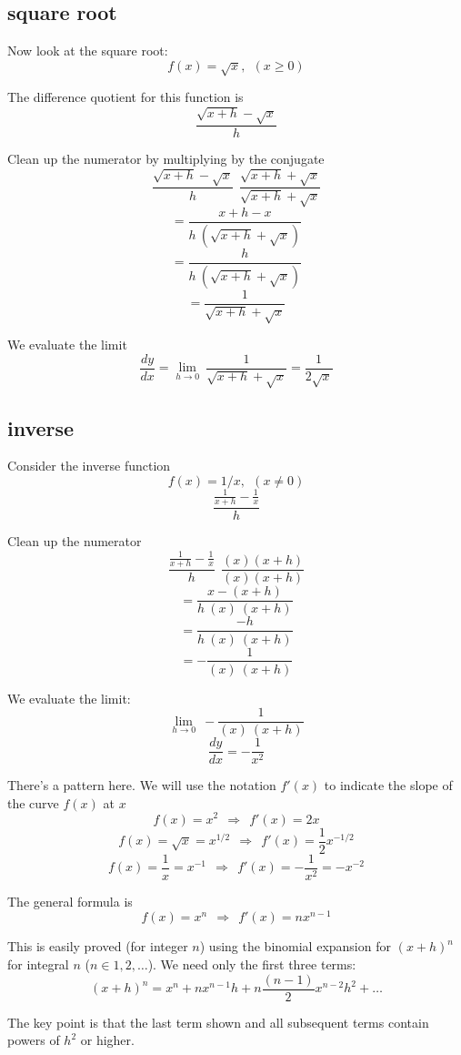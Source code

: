 \documentclass[11pt, oneside]{article}
\begin{document}
\subsection*{square root}

Now look at the square root:
\[  f(x)=\sqrt{x}, \ \ (x \ge 0) \]

The difference quotient for this function is
\[   \frac{\sqrt{x+h} - \sqrt{x}}{h} \]

Clean up the numerator by multiplying by the conjugate
\[    \frac{\sqrt{x+h} - \sqrt{x}}{h} \ \  \frac{\sqrt{x+h} + \sqrt{x}}{\sqrt{x+h} + \sqrt{x}} \]
\[    = \frac{x + h - x}{h \ (\sqrt{x+h} + \sqrt{x})} \]
\[    = \frac{h}{h \ (\sqrt{x+h} + \sqrt{x}) } \]
\[    = \frac{1}{\sqrt{x+h} + \sqrt{x}} \]

We evaluate the limit
\[    \frac{dy}{dx} = \lim_{h \to 0} \  \frac{1}{\sqrt{x+h} + \sqrt{x}} = \frac{1}{2\sqrt{x}} \]

\subsection*{inverse}

Consider the inverse function
\[   f(x)=1/x, \ \ (x \ne 0) \]
\[    \frac {  \frac{1}{x+h} - \frac{1}{x}  }  {h} \]

Clean up the numerator
\[    \frac {  \frac{1}{x+h} - \frac{1}{x}  }  {h} \ \  \frac{(x)(x+h)}{(x)(x+h)} \]
\[    = \frac {x - (x+h)}  {h\ (x) \ (x+h)} \]
\[    = \frac {-h}  {h\ (x) \ (x+h)} \]
\[    = -\frac {1}  {(x) \ (x+h)} \]

We evaluate the limit:
\[    \lim_{h \to 0} \  -\frac {1}  {(x) \ (x+h)} \]
\[ \frac{dy}{dx} = - \frac{1}{x^2} \]

There's a pattern here.  We will use the notation $f'(x)$ to indicate the slope of the curve $f(x)$ at $x$
\[       f(x) = x^2 \ \ \Rightarrow \ \  f'(x) = 2x \]
\[       f(x) = \sqrt{x} = x^{1/2}\ \ \Rightarrow \ \  f'(x) = \frac{1}{2}x^{-1/2} \]
\[       f(x) = \frac{1}{x} = x^{-1} \ \ \Rightarrow \ \  f'(x) = -\frac{1}{x^2} = -x^{-2} \]

The general formula is
\[       f(x) = x^n \ \ \Rightarrow \ \  f'(x) = nx^{n-1} \]

This is easily proved (for integer $n$) using the binomial expansion for $(x + h)^n$ for integral $n$ ($n \in 1,2, \dots$).  We need only the first three terms:
\[         (x + h)^n = x^n + n x^{n-1} h + n\frac{(n-1)}{2}x^{n-2} h^2 + \dots  \]

The key point is that the last term shown and all subsequent terms contain powers of $h^2$ or higher.  
\end{document}
